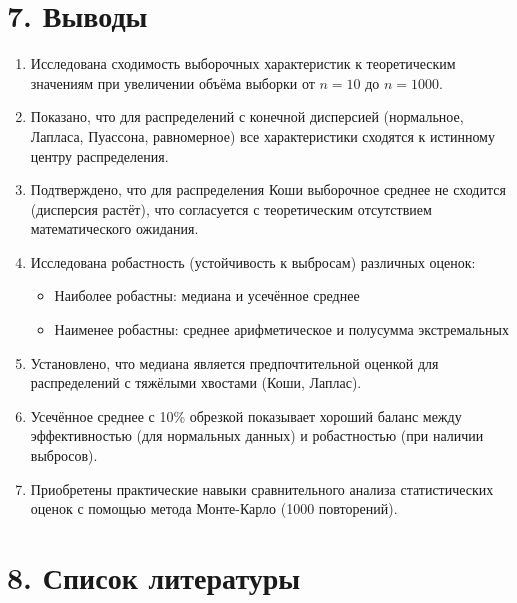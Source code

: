 \documentclass[a4paper,14pt]{extarticle}
\begin{document}
\section*{7. Выводы}

\begin{enumerate}
    \item Исследована сходимость выборочных характеристик к теоретическим значениям при увеличении объёма выборки от $n=10$ до $n=1000$.
    
    \item Показано, что для распределений с конечной дисперсией (нормальное, Лапласа, Пуассона, равномерное) все характеристики сходятся к истинному центру распределения.
    
    \item Подтверждено, что для распределения Коши выборочное среднее не сходится (дисперсия растёт), что согласуется с теоретическим отсутствием математического ожидания.
    
    \item Исследована робастность (устойчивость к выбросам) различных оценок:
    \begin{itemize}
        \item Наиболее робастны: медиана и усечённое среднее
        \item Наименее робастны: среднее арифметическое и полусумма экстремальных
    \end{itemize}
    
    \item Установлено, что медиана является предпочтительной оценкой для распределений с тяжёлыми хвостами (Коши, Лаплас).
    
    \item Усечённое среднее с 10\% обрезкой показывает хороший баланс между эффективностью (для нормальных данных) и робастностью (при наличии выбросов).
    
    \item Приобретены практические навыки сравнительного анализа статистических оценок с помощью метода Монте-Карло (1000 повторений).
\end{enumerate}

\section*{8. Список литературы}
\end{document}
